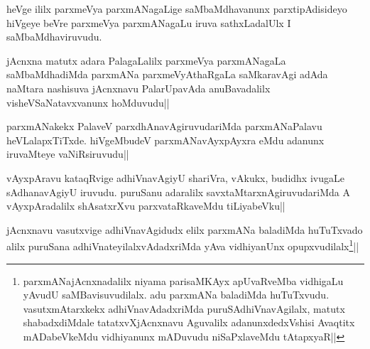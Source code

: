 
\begin{artha} 
heVge ililx parxmeVya parxmANagaLige saMbaMdhavanunx parxtipAdisideyo 
hiVgeye beVre parxmeVya parxmANagaLu iruva sathxLadalUlx I 
saMbaMdhaviruvudu. 
\end{artha}

\begin{artha} 
jAcnxna matutx adara PalagaLalilx parxmeVya parxmANagaLa 
saMbaMdhadiMda parxmANa parxmeVyAthaRgaLa saMkaravAgi adAda naMtara 
nashisuva jAcnxnavu PalarUpavAda anuBavadalilx visheVSaNatavxvanunx 
hoMduvudu||
\end{artha}

\begin{artha} 
parxmANakekx PalaveV parxdhAnavAgiruvudariMda parxmANaPalavu 
heVLalapxTiTxde. hiVgeMbudeV parxmANavAyxpAyxra eMdu adanunx 
iruvaMteye vaNiRsiruvudu||
\end{artha}


\begin{artha} 
vAyxpAravu kataqRvige adhiVnavAgiyU shariVra, vAkukx, budidhx ivugaLe 
sAdhanavAgiyU iruvudu. puruSanu adaralilx savxtaMtarxnAgiruvudariMda A 
vAyxpAradalilx shAsatxrXvu parxvataRkaveMdu tiLiyabeVku||
\end{artha}

\begin{artha} 
jAcnxnavu vasutxvige adhiVnavAgidudx elilx parxmANa baladiMda 
huTuTxvado alilx puruSana adhiVnateyilalxvAdadxriMda yAva vidhiyanUnx 
opupxvudilalx\footnote[1]{parxmANajAcnxnadalilx niyama parisaMKAyx 
apUvaRveMba vidhigaLu yAvudU saMBavisuvudilalx. adu parxmANa baladiMda 
huTuTxvudu. vasutxmAtarxkekx adhiVnavAdadxriMda puruSAdhiVnavAgilalx, 
matutx shabadxdiMdale tatatxvXjAcnxnavu Aguvalilx adanunxdedxVshisi 
Avaqtitx mADabeVkeMdu vidhiyanunx mADuvudu niSaPxlaveMdu tAtapxyaR||}||
\end{artha}


